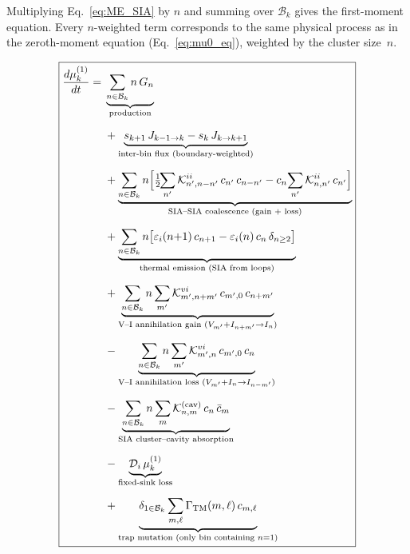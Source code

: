 \documentclass[pdflatex,sn-basic]{sn-jnl} %
\begin{document}
Multiplying Eq.~\eqref{eq:ME_SIA} by $n$ and summing over
$\mathcal{B}_k$ gives the first-moment equation.  Every $n$-weighted
term corresponds to the same physical process as in the zeroth-moment
equation (Eq.~\ref{eq:mu0_eq}), weighted by the cluster size~$n$.

\clearpage
\begin{equation}\label{eq:mu1_eq}
\boxed{
\begin{split}
    \frac{d\mu_k^{(1)}}{dt} = {} &
    \underbrace{
        \sum_{n \in \mathcal{B}_k} n\,G_n
    }_{\text{production}}
    \\[6pt]
    &+ \underbrace{
        s_{k+1}\,J_{k-1 \to k} - s_k\,J_{k \to k+1}
    }_{\text{inter-bin flux (boundary-weighted)}}
    \\[6pt]
    &+ \underbrace{
        \sum_{n \in \mathcal{B}_k} n\Bigl[
        \tfrac{1}{2}\!\!\sum_{n'}\mathcal{K}_{n',n-n'}^{ii}\,c_{n'}\,c_{n-n'}
        - c_n\!\sum_{n'}\mathcal{K}_{n,n'}^{ii}\,c_{n'}
        \Bigr]
    }_{\text{SIA--SIA coalescence (gain + loss)}}
    \\[6pt]
    &+ \underbrace{
        \sum_{n \in \mathcal{B}_k} n\bigl[
        \varepsilon_i(n{+}1)\,c_{n+1} - \varepsilon_i(n)\,c_n\,\delta_{n\ge 2}
        \bigr]
    }_{\text{thermal emission (SIA from loops)}}
    \\[6pt]
    &+ \underbrace{
        \sum_{n \in \mathcal{B}_k} n
        \sum_{m'}\mathcal{K}_{m',n+m'}^{vi}\,c_{m',0}\,c_{n+m'}
    }_{\text{V--I annihilation gain } (V_{m'}+I_{n+m'}\to I_n)}
    \\[6pt]
    &- \underbrace{
        \sum_{n \in \mathcal{B}_k} n
        \sum_{m'}\mathcal{K}_{m',n}^{vi}\,c_{m',0}\,c_n
    }_{\text{V--I annihilation loss } (V_{m'}+I_n\to I_{n-m'})}
    \\[6pt]
    &- \underbrace{
        \sum_{n \in \mathcal{B}_k} n\sum_m
        \mathcal{K}_{n,m}^{(\mathrm{cav})}\,c_n\,\bar{c}_m
    }_{\text{SIA cluster--cavity absorption}}
    \\[6pt]
    &- \underbrace{
        \mathcal{D}_i\,\mu_k^{(1)}
    }_{\text{fixed-sink loss}}
    \\[6pt]
    &+ \underbrace{
        \delta_{1 \in \mathcal{B}_k}\sum_{m,\ell}
        \Gamma_{\mathrm{TM}}(m,\ell)\,c_{m,\ell}
    }_{\text{trap mutation (only bin containing }n{=}1\text{)}}
\end{split}
}
\end{equation}
\end{document}
